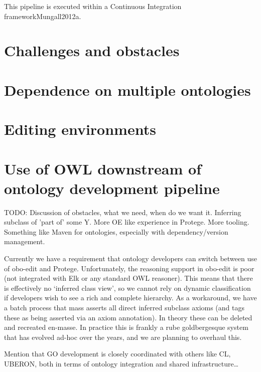 \documentclass{llncs}
\begin{document}
This pipeline is executed within a Continuous Integration
framework{Mungall2012a}.

\section{Challenges and obstacles}

\section{Dependence on multiple ontologies}

\section{Editing environments}

\section{Use of OWL downstream of ontology development pipeline}


TODO: Discussion of obstacles, what we need, when do we want it. Inferring
subclass of 'part of' some Y. More OE like experience in Protege. More
tooling. Something like Maven for ontologies, especially with
dependency/version management.

Currently we have a requirement that ontology developers can switch between use of obo-edit and Protege. Unfortunately, the reasoning support in obo-edit is poor (not integrated with Elk or any standard OWL reasoner). This means that there is effectively no ‘inferred class view’, so we cannot rely on dynamic classification if developers wish to see a rich and complete hierarchy. As a workaround, we have a batch process that mass asserts all direct inferred subclass axioms (and tags these as being asserted via an axiom annotation). In theory these can be deleted and recreated en-masse. In practice this is frankly a rube goldbergesque system that has evolved ad-hoc over the years, and we are planning to overhaul this.

Mention that GO development is closely coordinated with others like CL, UBERON, both in terms of ontology integration and shared infrastructure…
\end{document}

